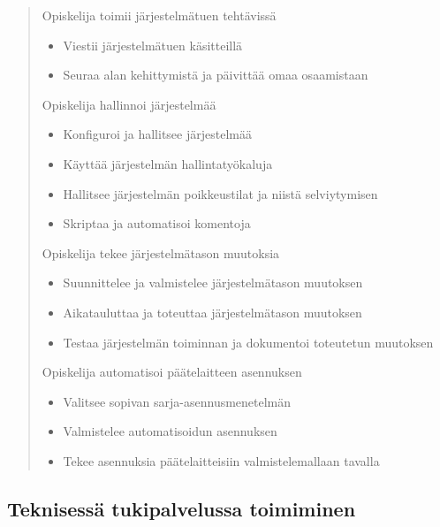 \documentclass[../wifi-security.tex]{subfiles}
\begin{document}
\begin{quote}
Opiskelija toimii järjestelmätuen tehtävissä
\begin{itemize}
\item Viestii järjestelmätuen käsitteillä
\item Seuraa alan kehittymistä ja päivittää omaa osaamistaan
\end{itemize}
Opiskelija hallinnoi järjestelmää
\begin{itemize}
\item Konfiguroi ja hallitsee järjestelmää
\item Käyttää järjestelmän hallintatyökaluja
\item Hallitsee järjestelmän poikkeustilat ja niistä selviytymisen
\item Skriptaa ja automatisoi komentoja
\end{itemize}
Opiskelija tekee järjestelmätason muutoksia
\begin{itemize}
\item Suunnittelee ja valmistelee järjestelmätason muutoksen
\item Aikatauluttaa ja toteuttaa järjestelmätason muutoksen
\item Testaa järjestelmän toiminnan ja dokumentoi toteutetun muutoksen
\end{itemize}
Opiskelija automatisoi päätelaitteen asennuksen
\begin{itemize}
\item Valitsee sopivan sarja-asennusmenetelmän
\item Valmistelee automatisoidun asennuksen
\item Tekee asennuksia päätelaitteisiin valmistelemallaan tavalla
\end{itemize}
\end{quote}

\subsection{Teknisessä tukipalvelussa toimiminen}
\end{document}
